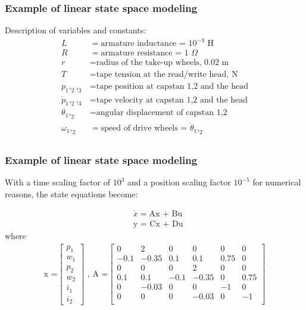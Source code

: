 \begin{frame}
	\frametitle{Example of linear state space modeling}
Description of variables and constants:
\vspace{0.1cm}
\begin{align*}
L&=\text{armature inductance = }10^{-3}\text{ H}\\
R&=\text{armature resistance = 1 }\Omega\\
r&=\text{radius of the take-up wheels, 0.02 m}\\
T&=\text{tape tension at the read/write head, N}\\
{p_1,_2,_3}&=\text{tape position at capstan 1,2 and the head}\\
{\dot{p}_1,_2,_3}&=\text{tape velocity at capstan 1,2 and the head}\\
{{\theta}_1,_2}&=\text{angular displacement of capstan 1,2}\\
{{\omega}_1,_2}&=\text{speed of drive wheels = }{\dot{\theta}_1,_2}\\
\end{align*}
\end{frame}

\begin{frame}
	\frametitle{Example of linear state space modeling}
With a time scaling factor of $10^3$ and a position scaling factor $10^{−5}$ for numerical reasons, the state equations become:
\vspace{-0.6cm}

        \begin{align*}
		&\dot{x} = \text{Ax + Bu}\\
				&\text{y = Cx + Du}
		\end{align*}
\vspace{0.0cm}
where
\begin{align*}
{
\text{x =}\begin{bmatrix} 
p_1 \\
w_1\\
p_2\\
w_2\\
i_1\\
i_2
\end{bmatrix}
\text{ , A =}\begin{bmatrix} 
0 & 2 & 0 & 0 & 0 & 0 \\
-0.1 & -0.35 & 0.1 & 0.1 & 0.75 & 0\\
0 & 0 & 0 & 2 & 0 & 0\\
0.1 & 0.1 & -0.1 & -0.35 & 0 & 0.75\\
0 & -0.03 & 0 & 0 & -1 & 0\\
0 & 0 & 0 & -0.03 & 0 & -1\\
\end{bmatrix}
}
\end{align*}
\end{frame}

